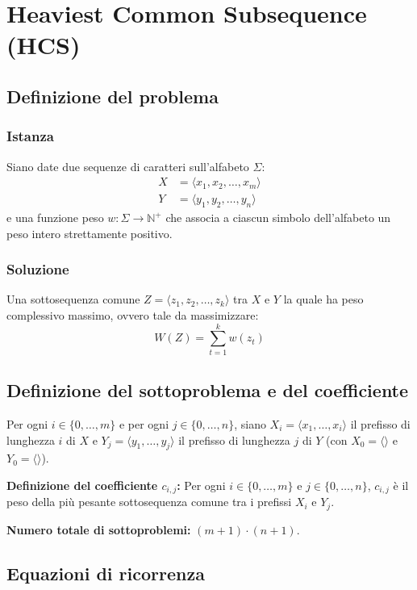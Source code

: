 \chapter{Heaviest Common Subsequence (HCS)}

\section{Definizione del problema}

\subsection{Istanza}
Siano date due sequenze di caratteri sull'alfabeto $\Sigma$:
\begin{align*}
    X &= \langle x_1, x_2, \dots, x_m \rangle \\
    Y &= \langle y_1, y_2, \dots, y_n \rangle
\end{align*}
e una funzione peso $w : \Sigma \to \mathbb{N}^+$ che associa a ciascun simbolo dell'alfabeto un peso intero strettamente positivo.

\subsection{Soluzione}
Una sottosequenza comune $Z = \langle z_1, z_2, \dots, z_k \rangle$ tra $X$ e $Y$ la quale ha peso complessivo massimo, ovvero tale da massimizzare:
\[
    W(Z) = \sum_{t=1}^{k} w(z_t)
\]

\section{Definizione del sottoproblema e del coefficiente}
Per ogni $i \in \{0, \dots, m\}$ e per ogni $j \in \{0, \dots, n\}$, siano $X_i = \langle x_1, \dots, x_i \rangle$ il prefisso di lunghezza $i$ di $X$ e $Y_j = \langle y_1, \dots, y_j \rangle$ il prefisso di lunghezza $j$ di $Y$ (con $X_0 = \langle \rangle$ e $Y_0 = \langle \rangle$).

\medskip
\noindent
\textbf{Definizione del coefficiente $c_{i,j}$:} Per ogni $i \in \{0, \dots, m\}$ e $j \in \{0, \dots, n\}$, $c_{i,j}$ è il peso della più pesante sottosequenza comune tra i prefissi $X_i$ e $Y_j$.

\medskip
\noindent
\textbf{Numero totale di sottoproblemi:} $(m + 1) \cdot (n + 1)$.

\section{Equazioni di ricorrenza}

